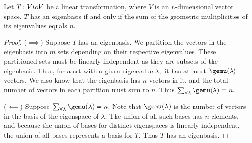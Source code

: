 Let $T:V\\to V$ be a linear transformation, where $V$ is an $n$-dimensional vector space. $T$ has an eigenbasis if and only if the sum of the geometric multiplicities of its eigenvalues equals $n.$

\begin{proof}
    ($\implies$) Suppose $T$ has an eigenbasis. We partition the vectors in the eigenbasis into $m$ sets depending on their respective eigenvalues. These partitioned sets must be linearly independent as they are subsets of the eigenbasis. Thus, for a set with a given eigenvalue $\lambda,$ it has at most $\gemu(\lambda)$ vectors. We also know that the eigenbasis has $n$ vectors in it, and the total number of vectors in each partition must sum to $n.$ Thus $\sum_{\forall \lambda} \gemu(\lambda) = n.$
    
    ($\impliedby$) Suppose $\sum_{\forall \lambda} \gemu(\lambda) = n.$ Note that $\gemu(\lambda)$ is the number of vectors in the basis of the eigenspace of $\lambda.$ The union of all such bases has $n$ elements, and because the union of bases for distinct eigenspaces is linearly independent, the union of all bases represents a basis for $T.$ Thus $T$ has an eigenbasis.
\end{proof}